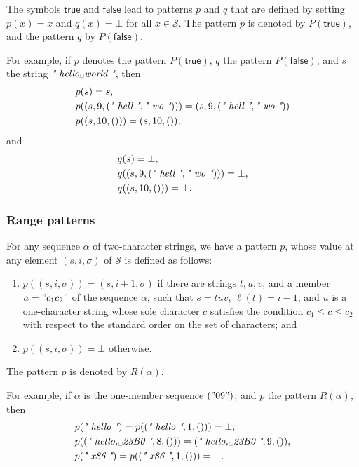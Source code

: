 \documentclass{article}
\begin{document}
The symbols \(\mathsf{true}\) and \(\mathsf{false}\) lead to patterns
\(p\) and \(q\) that are defined by setting \(p(x) = x\) and
\(q(x) = \bot\) for all \(x \in \mathcal{S}\).  The pattern \(p\) is
denoted by \(P(\mathsf{true})\), and the pattern \(q\) by
\(P(\mathsf{false})\).

For example, if \(p\) denotes the pattern \(P(\mathsf{true})\), \(q\)
the pattern \(P(\mathsf{false})\), and \(s\) the string
\(\text{\itshape" \text{hello␣world} "}\), then
\begin{align*}
  &p(s) = s, \\
  &p((s, 9, (\text{\itshape" hell "}, \text{\itshape" wo "}))) =
    (s, 9, (\text{\itshape" hell "}, \text{\itshape" wo "})) \\
  &p((s, 10, ())) = (s, 10, ()),
\end{align*}
and
\begin{align*}
  &q(s) = \bot, \\
  &q((s, 9, (\text{\itshape" hell "}, \text{\itshape" wo "}))) = \bot, \\
  &q((s, 10, ())) = \bot.
\end{align*}

\subsubsection{Range patterns}
\label{sec:9vfw1yf3}

For any sequence \(\alpha\) of two-character strings, we have a
pattern \(p\), whose value at any element \((s, i, \sigma)\) of
\(\mathscr{S}\) is defined as follows:
\begin{enumerate}
\item \(p((s, i, \sigma)) = (s, i + 1, \sigma)\) if there are strings
  \(t, u, v\), and a member \(a = "c_1c_2"\) of the sequence
  \(\alpha\), such that \(s = tuv\), \(\ell(t) = i - 1\), and \(u\) is
  a one-character string whose sole character \(c\) satisfies the
  condition \(c_1 \leq c \leq c_2\) with respect to the standard order
  on the set of characters; and
\item \(p((s, i, \sigma)) = \bot\) otherwise.
\end{enumerate}
The pattern \(p\) is denoted by \(R(\alpha)\).

For example, if \(\alpha\) is the one-member sequence \(("09")\), and
\(p\) the pattern \(R(\alpha)\), then
\begin{align*}
  &p(\text{\itshape" hello "}) = p((\text{\itshape" hello "}, 1, ())) = \bot, \\
  &p((\text{\itshape" hello,␣23B0 "}, 8, ())) = (\text{\itshape" hello,␣23B0 "}, 9, ()), \\
  &p(\text{\itshape" x86 "}) = p((\text{\itshape" x86 "}, 1, ())) = \bot.
\end{align*}
\end{document}
